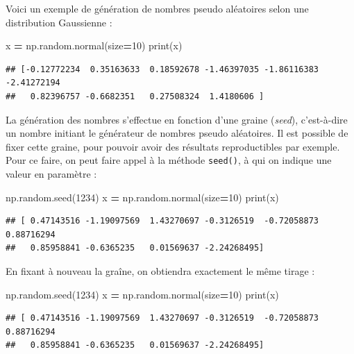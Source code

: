 \documentclass[12pt,]{book}
\newenvironment{Shaded}{\begin{snugshade}}{\end{snugshade}}
\newcommand{\DecValTok}[1]{\textcolor[rgb]{0.00,0.00,0.81}{#1}}
\newcommand{\OperatorTok}[1]{\textcolor[rgb]{0.81,0.36,0.00}{\textbf{#1}}}
\newcommand{\BuiltInTok}[1]{#1}
\newcommand{\NormalTok}[1]{#1}
\numberwithin{equation}{section}
\numberwithin{countremarque}{section}
\begin{document}
Voici un exemple de génération de nombres pseudo aléatoires selon une
distribution Gaussienne :

\begin{Shaded}
\begin{Highlighting}[]
\NormalTok{x }\OperatorTok{=}\NormalTok{ np.random.normal(size}\OperatorTok{=}\DecValTok{10}\NormalTok{)}
\BuiltInTok{print}\NormalTok{(x)}
\end{Highlighting}
\end{Shaded}

\begin{lstlisting}
## [-0.12772234  0.35163633  0.18592678 -1.46397035 -1.86116383 -2.41272194
##   0.82396757 -0.6682351   0.27508324  1.4180606 ]
\end{lstlisting}

La génération des nombres s'effectue en fonction d'une graine
(\emph{seed}), c'est-à-dire un nombre initiant le générateur de nombres
pseudo aléatoires. Il est possible de fixer cette graine, pour pouvoir
avoir des résultats reproductibles par exemple. Pour ce faire, on peut
faire appel à la méthode \texttt{seed()}, à qui on indique une valeur en
paramètre :

\begin{Shaded}
\begin{Highlighting}[]
\NormalTok{np.random.seed(}\DecValTok{1234}\NormalTok{)}
\NormalTok{x }\OperatorTok{=}\NormalTok{ np.random.normal(size}\OperatorTok{=}\DecValTok{10}\NormalTok{)}
\BuiltInTok{print}\NormalTok{(x)}
\end{Highlighting}
\end{Shaded}

\begin{lstlisting}
## [ 0.47143516 -1.19097569  1.43270697 -0.3126519  -0.72058873  0.88716294
##   0.85958841 -0.6365235   0.01569637 -2.24268495]
\end{lstlisting}

En fixant à nouveau la graîne, on obtiendra exactement le même tirage :

\begin{Shaded}
\begin{Highlighting}[]
\NormalTok{np.random.seed(}\DecValTok{1234}\NormalTok{)}
\NormalTok{x }\OperatorTok{=}\NormalTok{ np.random.normal(size}\OperatorTok{=}\DecValTok{10}\NormalTok{)}
\BuiltInTok{print}\NormalTok{(x)}
\end{Highlighting}
\end{Shaded}

\begin{lstlisting}
## [ 0.47143516 -1.19097569  1.43270697 -0.3126519  -0.72058873  0.88716294
##   0.85958841 -0.6365235   0.01569637 -2.24268495]
\end{lstlisting}
\end{document}
